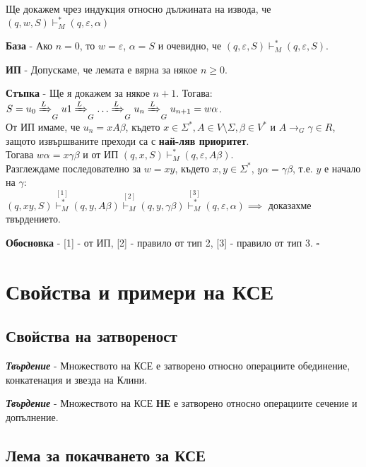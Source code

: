 \documentclass[fleqn,12pt]{article}
\begin{document}
\begin{flushleft}
Ще докажем чрез индукция относно дължината на извода, че $(q, w, S) \vdash_M^* (q, \varepsilon, \alpha)$

\textbf{База} - Ако $n = 0$, то $w=\varepsilon$, $\alpha = S$ и очевидно, че $(q, \varepsilon, S) \vdash_M^* (q, \varepsilon, S)$.

\textbf{ИП} - Допускаме, че лемата е вярна за някое $n \geq 0$.

\textbf{Стъпка} - Ще я докажем за някое $n + 1$. Тогава: \\

$S = u_0 \xRightarrow[]{L}_G u1 \xRightarrow[]{L}_G \dots \xRightarrow[]{L}_G u_n \xRightarrow[]{L}_G u_{n+1} = w\alpha$. \\
От ИП имаме, че $u_n = xA\beta$, където $x \in \Sigma^*, A \in V \setminus \Sigma, \beta \in V^*$ и $A \to_G \gamma \in R$, защото извършваните преходи са с \textbf{най-ляв приоритет}. \\
Тогава $w\alpha = x\gamma\beta$ и от ИП $(q, x, S) \vdash_M^* (q, \varepsilon, A\beta)$. \\
Разглеждаме последователно за $w = xy$, където $x, y \in \Sigma^*$, $y\alpha = \gamma\beta$, т.е. $y$ е начало на $\gamma$: \\

$(q, xy, S) \overset{[1]}{\vdash_M^*} (q, y, A\beta) \overset{[2]}{\vdash_M} (q, y, \gamma\beta) \overset{[3]}{\vdash_M^*} (q, \varepsilon, \alpha) \implies$ доказахме твърдението.

\textbf{Обосновка} - [1] - от ИП, [2] - правило от тип 2, [3] - правило от тип 3. $\square$

\section{Свойства и примери на КСЕ}

\subsection{Свойства на затвореност}

\textit{\textbf{Твърдение}} - Множеството на КСЕ е затворено относно операциите обединение, конкатенация и звезда на Клини.

\textit{\textbf{Твърдение}} - Множеството на КСЕ \textbf{НЕ} е затворено относно операциите сечение и допълнение.

\subsection{Лема за покачването за КСЕ}


\end{flushleft}
\end{document}
